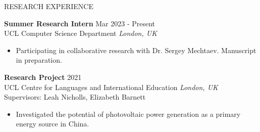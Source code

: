 \documentclass{resume} %
\begin{document}
\begin{rSection}{RESEARCH EXPERIENCE}

\textbf{Summer Research Intern} \hfill Mar 2023 - Present\\
UCL Computer Science Department \hfill \textit{London, UK}
\begin{itemize}
    \itemsep -3pt {} 
    \item Participating in collaborative research with Dr. Sergey Mechtaev. Manuscript in preparation.
\end{itemize}

\textbf{Research Project} \hfill 2021\\
UCL Centre for Languages and International Education \hfill \textit{London, UK}\\
Supervisors: Leah Nicholls, Elizabeth Barnett
\begin{itemize}
    \itemsep -3pt {} 
    \item Investigated the potential of photovoltaic power generation as a primary energy source in China.
\end{itemize}

\end{rSection}
\end{document}

